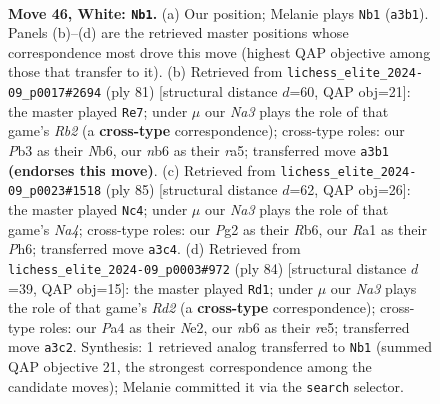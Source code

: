 \documentclass[11pt]{article}
\begin{document}
\clearpage

\begin{figure}[p]\centering
\begin{subfigure}{0.46\textwidth}\centering
\resizebox{\linewidth}{!}{%
\newchessgame
\chessboard[
  setfen={r5k1/2r2p1p/1n4p1/p3p1P1/P3P3/NP4RP/4K1P1/R7 w - - 6 46},
  showmover=false,
  pgfstyle=straightmove, color=movearrow, markmove={a3-b1}
]}
\caption{}
\end{subfigure}\hfill
\begin{subfigure}{0.46\textwidth}\centering
\resizebox{\linewidth}{!}{%
\newchessgame
\chessboard[
  setfen={8/pr3pp1/1n1kp2p/R6P/5P2/P5P1/4BP2/6K1 b - - 10 41},
  showmover=false,
  pgfstyle=straightmove, color=movearrow, markmove={b7-e7}
]}
\caption{}
\end{subfigure}
\\[4pt]
\begin{subfigure}{0.46\textwidth}\centering
\resizebox{\linewidth}{!}{%
\newchessgame
\chessboard[
  setfen={5k2/5p2/1r2p1pp/np6/p3R3/P1PN2P1/1P2KP1P/8 b - - 11 43},
  showmover=false,
  pgfstyle=straightmove, color=movearrow, markmove={a5-c4}
]}
\caption{}
\end{subfigure}\hfill
\begin{subfigure}{0.46\textwidth}\centering
\resizebox{\linewidth}{!}{%
\newchessgame
\chessboard[
  setfen={8/2r2k2/p4n2/1p1pr1p1/6Pp/P2R1P1P/1P1RNK2/8 w - - 0 43},
  showmover=false,
  pgfstyle=straightmove, color=movearrow, markmove={d2-d1}
]}
\caption{}
\end{subfigure}
\caption{\textbf{Move 46, White: \texttt{Nb1}.} (a) Our position; Melanie plays \texttt{Nb1} (\texttt{a3b1}). Panels (b)--(d) are the retrieved master positions whose correspondence most drove this move (highest QAP objective among those that transfer to it). (b) Retrieved from \texttt{lichess\_elite\_2024-09\_p0017\#2694} (ply 81) [structural distance $d$=60, QAP obj=21]: the master played \texttt{Re7}; under $\mu$ our \emph{Na3} plays the role of that game's \emph{Rb2} (a \textbf{cross-type} correspondence); cross-type roles: our \emph{P}b3 as their \emph{N}b6, our \emph{n}b6 as their \emph{r}a5; transferred move \texttt{a3b1} \textbf{(endorses this move)}. (c) Retrieved from \texttt{lichess\_elite\_2024-09\_p0023\#1518} (ply 85) [structural distance $d$=62, QAP obj=26]: the master played \texttt{Nc4}; under $\mu$ our \emph{Na3} plays the role of that game's \emph{Na4}; cross-type roles: our \emph{P}g2 as their \emph{R}b6, our \emph{R}a1 as their \emph{P}h6; transferred move \texttt{a3c4}. (d) Retrieved from \texttt{lichess\_elite\_2024-09\_p0003\#972} (ply 84) [structural distance $d$=39, QAP obj=15]: the master played \texttt{Rd1}; under $\mu$ our \emph{Na3} plays the role of that game's \emph{Rd2} (a \textbf{cross-type} correspondence); cross-type roles: our \emph{P}a4 as their \emph{N}e2, our \emph{n}b6 as their \emph{r}e5; transferred move \texttt{a3c2}. Synthesis: 1 retrieved analog transferred to \texttt{Nb1} (summed QAP objective 21, the strongest correspondence among the candidate moves); Melanie committed it via the \texttt{search} selector.}
\label{fig:thought-m90}
\end{figure}
\end{document}
